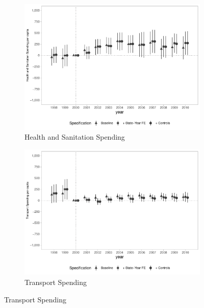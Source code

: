 \begin{figure}[h]
    \begin{center}
    \caption{Causal Effects on Public Spending per capita - By Category}\label{fig:finbra3}
    \begin{subfigure}{0.32\textwidth}
        \caption{\scriptsize Health and Sanitation Spending}\label{fig:finbra3_a}
        \centering
        \includegraphics[width=\textwidth]{plots/spending/finbra_desp_saude_san_pcapita_dist_ec29_baseline_dist_ec29_baseline_full.pdf}
    \end{subfigure}
    \begin{subfigure}{0.32\textwidth}
        \centering
        \caption{\scriptsize Transport Spending}\label{fig:finbra3_b}
        \includegraphics[width=\textwidth]{plots/spending/finbra_desp_transporte_pcapita_dist_ec29_baseline_dist_ec29_baseline_full.pdf}

\end{subfigure}
\end{center}
\end{figure}
